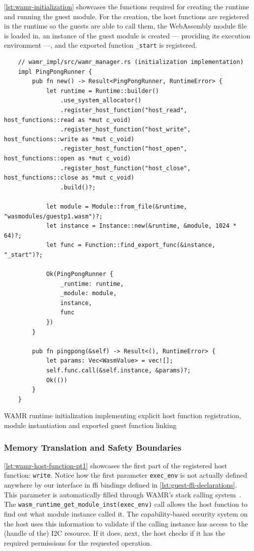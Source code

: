 \autoref{lst:wamr-initialization} showcases the functions required for creating the runtime and running the guest module. For the creation, the host functions are registered in the runtime so the guests are able to call them, the WebAssembly module file is loaded in, an instance of the guest module is created --- providing its execution environment ---, and the exported function \texttt{\_start} is registered.

\begin{listing}[H]
    \begin{verbatim}
    // wamr_impl/src/wamr_manager.rs (initialization implementation)
    impl PingPongRunner {
        pub fn new() -> Result<PingPongRunner, RuntimeError> {
            let runtime = Runtime::builder()
                .use_system_allocator()
                .register_host_function("host_read", host_functions::read as *mut c_void)
                .register_host_function("host_write", host_functions::write as *mut c_void)
                .register_host_function("host_open", host_functions::open as *mut c_void)
                .register_host_function("host_close", host_functions::close as *mut c_void)
                .build()?;
    
            let module = Module::from_file(&runtime, "wasmodules/guestp1.wasm")?;
            let instance = Instance::new(&runtime, &module, 1024 * 64)?;
            let func = Function::find_export_func(&instance, "_start")?;
            
            Ok(PingPongRunner { 
                _runtime: runtime, 
                _module: module, 
                instance, 
                func 
            })
        }
    
        pub fn pingpong(&self) -> Result<(), RuntimeError> {
            let params: Vec<WasmValue> = vec![];
            self.func.call(&self.instance, &params)?;
            Ok(())
        }
    }
    \end{verbatim}
    \caption{WAMR runtime initialization implementing explicit host function registration, module instantiation and exported guest function linking}
    \label{lst:wamr-initialization}
\end{listing}

\subsubsection{Memory Translation and Safety Boundaries}

\autoref{lst:wamr-host-function-pt1} showcases the first part of the registered host function: \texttt{write}. Notice how the first parameter \texttt{exec\_env} is not actually defined anywhere by our interface in \acrshort{ffi} bindings defined in \autoref{lst:guest-ffi-declarations}. This parameter is automatically filled through WAMR's stack calling system~\cite{wamr_stacks}. The \sloppy\texttt{wasm\_runtime\_get\_module\_inst(exec\_env)} call allows the host function to find out what module instance called it. The capability-based security system on the host uses this information to validate if the calling instance has access to the (handle of the) I2C resource. If it does, next, the host checks if it has the required permissions for the requested operation.

